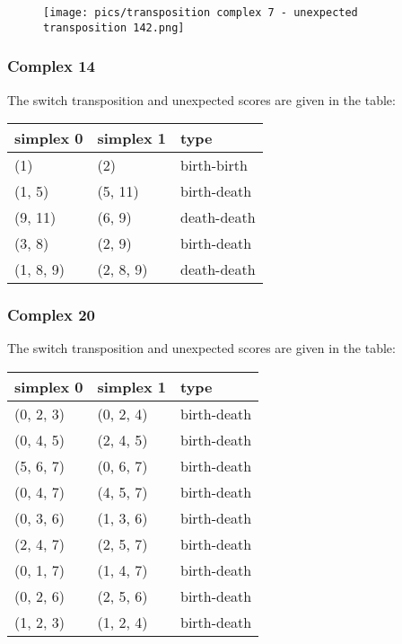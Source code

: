 \documentclass{article}
\begin{document}
\begin{figure}[ht]
\centering
\texttt{[image: pics/transposition complex 7 - unexpected transposition 142.png]}
\end{figure}


\subsubsection{Complex 14}
\par The switch transposition and unexpected scores are given in the table:
\begin{center}
\begin{tabular}{lll}
\toprule
simplex 0 & simplex 1 & type \\
\midrule
(1) & (2) & birth-birth \\
(1, 5) & (5, 11) & birth-death \\
(9, 11) & (6, 9) & death-death \\
(3, 8) & (2, 9) & birth-death \\
(1, 8, 9) & (2, 8, 9) & death-death \\
\bottomrule
\end{tabular}
\end{center}


\subsubsection{Complex 20}
\par The switch transposition and unexpected scores are given in the table:
\begin{center}
\begin{tabular}{lll}
\toprule
simplex 0 & simplex 1 & type \\
\midrule
(0, 2, 3) & (0, 2, 4) & birth-death \\
(0, 4, 5) & (2, 4, 5) & birth-death \\
(5, 6, 7) & (0, 6, 7) & birth-death \\
(0, 4, 7) & (4, 5, 7) & birth-death \\
(0, 3, 6) & (1, 3, 6) & birth-death \\
(2, 4, 7) & (2, 5, 7) & birth-death \\
(0, 1, 7) & (1, 4, 7) & birth-death \\
(0, 2, 6) & (2, 5, 6) & birth-death \\
(1, 2, 3) & (1, 2, 4) & birth-death \\
\bottomrule
\end{tabular}
\end{center}
\end{document}

